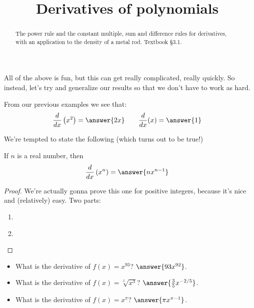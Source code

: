 \documentclass{ximera}
\title{Derivatives of polynomials}
\begin{document}
\begin{abstract}
The power rule and the constant multiple, sum and difference rules for derivatives, with an application to the density of a metal rod. Textbook §3.1.
\end{abstract}
\maketitle

All of the above is fun, but this can get really complicated, really quickly. So instead, let's try and generalize our results so that we don't have to work as hard.

From our previous examples we see that:
\[
\frac{d}{d x}\left(x^{2}\right)=\answer{2x} \qquad \frac{d}{d x}(x)=\answer{1}
\]

We're tempted to state the following (which turns out to be true!)

\begin{theorem}\label{theorem:5-1}
If $n$ is a real number, then
\[
\frac{d}{dx}\left(x^{n}\right)=\answer{n x^{n-1}}
\]
\end{theorem}

\begin{proof}
We're actually gonna prove this one for positive integers, because it's nice and (relatively) easy. Two parts:
\begin{enumerate}
  \item \begin{freeResponse}\end{freeResponse}
  \item \begin{freeResponse}\end{freeResponse}
\end{enumerate}
\end{proof}

\begin{example}\label{example:5-2}
\begin{itemize}
  \item What is the derivative of $f(x)=x^{93}$? $\answer{93 x^{92}}$.
  \item What is the derivative of $f(x)=\sqrt[5]{x^{3}}$? $\answer{\frac{3}{5} x^{-2/5}}$.
  \item What is the derivative of $f(x)=x^{\pi}$? $\answer{\pi x^{\pi-1}}$.
\end{itemize}
\end{example}
\end{document}
